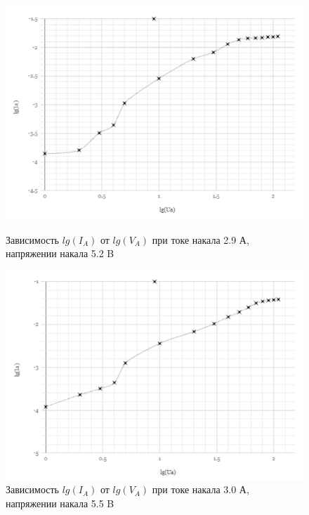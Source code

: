 \documentclass[a4paper]{article}
\begin{document}
\begin{figure}[h]
\begin{center}
\begin{minipage}[h]{0.45\linewidth}
\includegraphics[width=1\linewidth]{2_9.PNG}
\caption{Зависимость $lg(I_A)$ от $lg(V_A)$ при токе накала 2.9 А, напряжении накала 5.2 B} %
\end{minipage}
\hfill 
\begin{minipage}[h]{0.45\linewidth}
\includegraphics[width=1\linewidth]{3_0.PNG}
\caption{Зависимость $lg(I_A)$ от $lg(V_A)$ при токе накала 3.0 А, напряжении накала 5.5 B }
\label{ris:experimcoded}
\end{minipage}
\end{center}
\end{figure}
\end{document}
